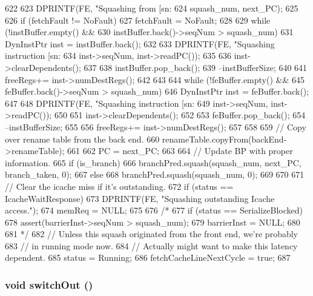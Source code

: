 \begin{DoxyCode}
622 {
623     DPRINTF(FE, "Squashing from [sn:%
624             squash_num, next_PC);
625 
626     if (fetchFault != NoFault)
627         fetchFault = NoFault;
628 
629     while (!instBuffer.empty() &&
630            instBuffer.back()->seqNum > squash_num) {
631         DynInstPtr inst = instBuffer.back();
632 
633         DPRINTF(FE, "Squashing instruction [sn:%
634                 inst->seqNum, inst->readPC());
635 
636         inst->clearDependents();
637 
638         instBuffer.pop_back();
639         --instBufferSize;
640 
641         freeRegs+= inst->numDestRegs();
642     }
643 
644     while (!feBuffer.empty() &&
645            feBuffer.back()->seqNum > squash_num) {
646         DynInstPtr inst = feBuffer.back();
647 
648         DPRINTF(FE, "Squashing instruction [sn:%
649                 inst->seqNum, inst->readPC());
650 
651         inst->clearDependents();
652 
653         feBuffer.pop_back();
654         --instBufferSize;
655 
656         freeRegs+= inst->numDestRegs();
657     }
658 
659     // Copy over rename table from the back end.
660     renameTable.copyFrom(backEnd->renameTable);
661 
662     PC = next_PC;
663 
664     // Update BP with proper information.
665     if (is_branch) {
666         branchPred.squash(squash_num, next_PC, branch_taken, 0);
667     } else {
668         branchPred.squash(squash_num, 0);
669     }
670 
671     // Clear the icache miss if it's outstanding.
672     if (status == IcacheWaitResponse) {
673         DPRINTF(FE, "Squashing outstanding Icache access.\n");
674         memReq = NULL;
675     }
676 /*
677     if (status == SerializeBlocked) {
678         assert(barrierInst->seqNum > squash_num);
679         barrierInst = NULL;
680     }
681 */
682     // Unless this squash originated from the front end, we're probably
683     // in running mode now.
684     // Actually might want to make this latency dependent.
685     status = Running;
686     fetchCacheLineNextCycle = true;
687 }
\end{DoxyCode}
\hypertarget{classFrontEnd_a05f299b443f8cc73a93d61572edc0218}{
\subsubsection[{switchOut}]{\setlength{\rightskip}{0pt plus 5cm}void switchOut ()}}
\label{classFrontEnd_a05f299b443f8cc73a93d61572edc0218}



